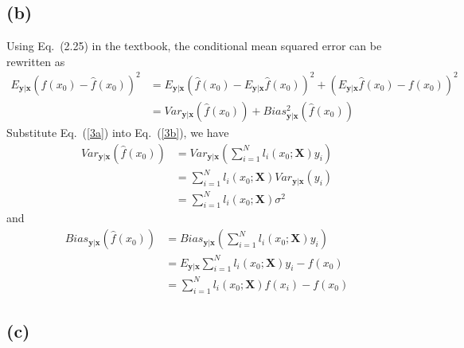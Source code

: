\documentclass[pra,groupedaddress,amsmath,amssymb, column]{revtex4}
\begin{document}
\subsection*{(b)}
Using Eq.~(2.25) in the textbook, the conditional mean squared error can be rewritten as
\begin{align}
E_{\mathbf{y|x}}(f(x_0) - \hat{f}(x_0))^2&= E_{\mathbf{y|x}}(\hat{f}(x_0) - E_{\mathbf{y|x}}\hat{f}(x_0))^2 + (E_{\mathbf{y|x}}\hat{f}(x_0) - {f}(x_0))^2 \nonumber\\
&=Var_{\mathbf{y|x}}(\hat{f}(x_0)) + Bias^2_{\mathbf{y|x}}(\hat{f}(x_0)) \label{3b}
\end{align}
Substitute Eq.~(\ref{3a}) into Eq.~(\ref{3b}), we have
\begin{align}
Var_{\mathbf{y|x}}(\hat{f}(x_0))  &= Var_{\mathbf{y|x}}\left(\sum_{i=1}^{N}l_i(x_0; \mathbf{X})y_i\right)  \nonumber\\
&=\sum_{i=1}^{N}l_i(x_0; \mathbf{X})Var_{\mathbf{y|x}}\left(y_i\right) \nonumber\\
&=\sum_{i=1}^{N}l_i(x_0; \mathbf{X})\sigma^2
\end{align}
and
\begin{align}
Bias_{\mathbf{y|x}}(\hat{f}(x_0)) &= Bias_{\mathbf{y|x}}\left(\sum_{i=1}^{N}l_i(x_0; \mathbf{X})y_i\right)  \nonumber\\
&= E_{\mathbf{y|x}}\sum_{i=1}^{N}l_i(x_0; \mathbf{X})y_i- {f}(x_0)\nonumber\\
&= \sum_{i=1}^{N}l_i(x_0; \mathbf{X})f(x_i)- {f}(x_0)
\end{align}

\subsection*{(c)}
\end{document}
